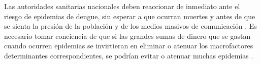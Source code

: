 Las autoridades sanitarias nacionales deben reaccionar de inmediato ante el riesgo de epidemias de
dengue, sin esperar a que ocurran muertes y antes de que se sienta la presión de la población y de
los medios masivos de comunicación \citep{gustavo2006dengue}. Es necesario tomar conciencia de que
si las grandes sumas de dinero que se gastan cuando ocurren epidemias se invirtieran en eliminar o
atenuar los macrofactores determinantes correspondientes, se podrían evitar o atenuar muchas
epidemias \citep{gustavo2006dengue}.
